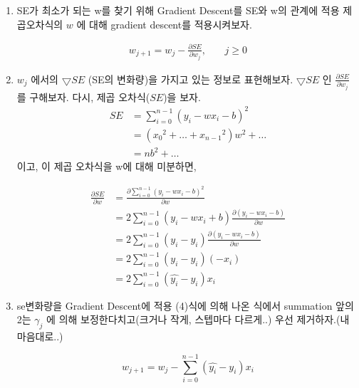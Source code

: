 \documentclass[11pt]{article}
\begin{document}
\begin{enumerate}
\item SE가 최소가 되는 w를 찾기 위해 Gradient Descent를 SE와 w의 관계에 적용
\label{sec:org63865a6}
제곱오차식의 \(w\) 에 대해 gradient descent를 적용시켜보자.

\begin{align}
  w_{j+1} = w_{j} -\frac{\partial SE}{\partial w_{j}},\ &&j \geq 0
\end{align}

\item \(w_{j}\) 에서의 \(\bigtriangledown SE\) (SE의 변화량)을 가지고 있는 정보로 표현해보자.
\label{sec:org456507c}
\(\bigtriangledown SE\) 인 \(\frac{\partial SE}{\partial w_{j}}\) 를 구해보자. 
다시, 제곱 오차식(\(SE\))을 보자.
\begin{equation*}
\begin{split}
  SE & = \sum_{i=0}^{n-1} ({y_{i} - wx_{i} - b})^2 \\
     & = ({x_{0}}^2 + \dots + {x_{n-1}}^2)w^2 + \dots \\
     & = nb^2 + \dots
\end{split}
\end{equation*}
이고, 이 제곱 오차식을 w에 대해 미분하면,

\begin{equation}
\begin{split}
  \frac{\partial{SE}}{\partial{w}} & =  \frac{\partial{\sum_{i=0}^{n-1} ({y_{i} - wx_{i} - b})^2}} {\partial{w}} \\
                                   & = 2\sum_{i=0}^{n-1} ({y_{i} - wx_{i} + b}) \frac{\partial{({y_{i} - wx_{i} - b})}}{\partial{w}} \\
                                   & = 2\sum_{i=0}^{n-1} ({y_{i} - \hat{y_{i}}}) \frac{\partial{({y_{i} - wx_{i} - b})}}{\partial{w}} \\
                                   & = 2\sum_{i=0}^{n-1} ({y_{i} - \hat{y_{i}}})(-x_{i}) \\
                                   & = 2\sum_{i=0}^{n-1} (\hat{y_{i}} - {y_{i}})x_{i}
\end{split}
\end{equation}

\item se변화량을 Gradient Descent에 적용
\label{sec:org850767f}
(4)식에 의해 나온 식에서 summation 앞의 2는 \(\gamma_{j}\) 에 의해 보정한다치고(크거나 작게, 스텝마다 다르게..) 우선 제거하자.(내 마음대로..)

\begin{equation*}
w_{j+1} = w_{j} - \sum_{i=0}^{n-1} (\hat{y_{i}} - {y_{i}})x_{i} 
\end{equation*}


\end{enumerate}
\end{document}
